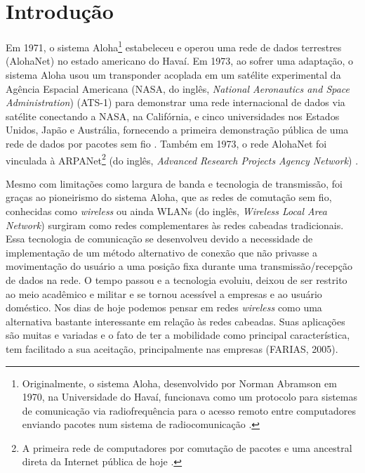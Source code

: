 \chapter{Introdução}
\label{cap:introducao}

Em 1971, o sistema Aloha\footnote{Originalmente, o sistema Aloha, desenvolvido por Norman Abramson em 1970, na Universidade do Havaí, funcionava como um protocolo para sistemas de comunicação via radiofrequência para o acesso remoto entre computadores enviando pacotes num sistema de radiocomunicação \cite{abramson1970acm, haykin2009}.} estabeleceu e operou uma rede de dados terrestres (AlohaNet) no estado americano do Havaí. Em 1973, ao sofrer uma adaptação, o sistema Aloha usou um transponder acoplada em um satélite experimental da Agência Espacial Americana (NASA, do inglês, \textit{National Aeronautics and Space Administration}) (ATS-1) para demonstrar uma rede internacional de dados via satélite conectando a NASA, na Califórnia, e cinco universidades nos Estados Unidos, Japão e Austrália, fornecendo a primeira demonstração pública de uma rede de dados por pacotes sem fio \cite{abramson1970acm, SchwartzAbramson2009ieee}. Também em 1973, o rede AlohaNet foi vinculada à ARPANet\footnote{A primeira rede de computadores por comutação de pacotes e uma ancestral direta da Internet pública de hoje \cite{kurose2013}.} (do inglês, \textit{Advanced Research Projects Agency Network}) \cite{abramson1970acm, SchwartzAbramson2009ieee}.

Mesmo com limitações como largura de banda e tecnologia de transmissão, foi graças ao pioneirismo do sistema Aloha, que as redes de comutação sem fio, conhecidas como \textit{wireless} ou ainda WLANs (do inglês, \textit{Wireless Local Area Network}) surgiram como redes complementares às redes cabeadas tradicionais. Essa tecnologia de comunicação se desenvolveu devido a necessidade de implementação de um método alternativo de conexão que não privasse a movimentação do usuário a uma posição fixa durante uma transmissão/recepção de dados na rede. O tempo passou e a tecnologia evoluiu, deixou de ser restrito ao meio acadêmico e militar e se tornou acessível a empresas e ao usuário doméstico. Nos dias de hoje podemos pensar em redes \textit{wireless} como uma alternativa bastante interessante em relação às redes cabeadas. Suas aplicações são muitas e variadas e o fato de ter a mobilidade como principal característica, tem facilitado a sua aceitação, principalmente nas empresas (FARIAS, 2005).

